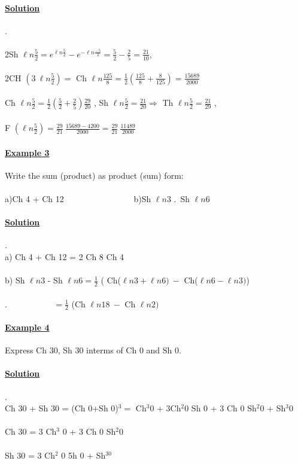 \documentclass{article}
\begin{document}
\small
\paragraph{\underline{Solution}}.
\\
\\ 2Sh $  \ell n \frac{5}{2} = e^{\ell n \frac{5}{2}} - e^{-\ell n \frac{-5}{2}} = \frac{5}{2} - \frac{2}{5} = \frac{21}{10}  $, 
\\
\\ 2CH $( 3 \ \ell n \frac{5}{2}) = $ Ch $ \ell n \frac{125}{8} = \frac{1}{2} (\frac{125}{8} + \frac{8}{125} ) = \frac{15689}{2000} $ 
\\
\\Ch $\ell n \frac{5}{2} = \frac{1}{2} (\frac{5}{2} + \frac{2}{5} ) \frac{29}{20}$ , Sh $ \ell n \frac{5}{2} = \frac{21}{20} \Rightarrow$ Th $\ell n \frac{5}{2} = \frac{21}{29}$ ,
\\
\\F $( \ell n \frac{5}{2}) = \frac{29}{21} \ \frac{15689 - 4200}{2000} = \frac{29}{21} \ \frac{11489}{2000}$ 
\paragraph{\underline{Example 3}} Write the sum (product) as product (sum) form:
\\
\\a)Ch 4 + Ch 12	\ \ \ \ \ \ \ \ \ \ \ \ \ \ \ \  b)Sh $\ell n 3$  .\ Sh $ \ell n 6$
\paragraph{\underline{Solution}}.
\\a) Ch 4 + Ch 12 = 2 Ch 8 Ch 4
\\
\\b) Sh $\ell n 3$ - Sh $\ell n 6 = \frac{1}{2}$ ( Ch($\ell n 3 + \ell n 6) \ -$ Ch($\ell n 6 - \ell n 3)$)
\\
\\ .$  \ \ \ \ \ \ \ \ \ \ \ \ \ \ \ \ \ \ \ \ \ \ \ \ \ =  \frac{1}{2}$  (Ch $\ell n 18 \ - $ Ch $ \ell n 2) \ $
\paragraph{\underline{Example 4}} Express Ch 30, Sh 30 interms of Ch 0 and Sh 0.
\paragraph{\underline{Solution}}.
\\Ch 30 + Sh 30 =  (Ch 0+Sh 0)$^3=$ Ch$^3$0 + 3Ch$^2$0 Sh 0 + 3 Ch 0 Sh$^2$0 + Sh$^3$0
\\
\\Ch 30 = 3 Ch$^3$ 0 + 3 Ch 0  Sh$^2$0   
\\
\\Sh 30 = 3 Ch$^2$ 0 5h 0 + Sh$^30$
\end{document}
